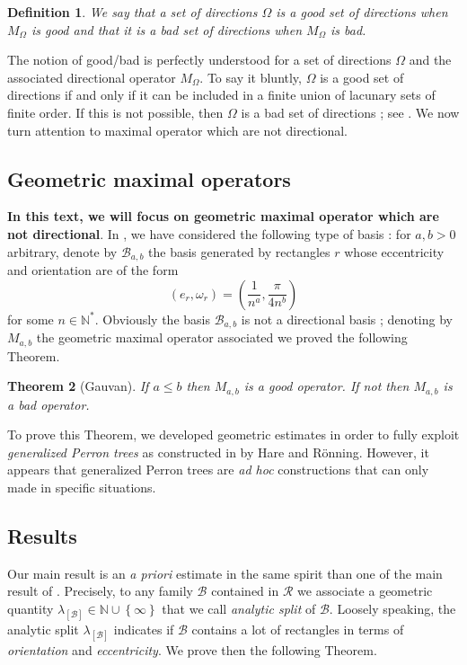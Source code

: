 \documentclass{article}
\newtheorem{thm}{Theorem}
\newtheorem{defn}[thm]{Definition}
\begin{document}
\begin{defn}
We say that a set of directions $\Omega$ is a good set of directions when $M_\Omega$ is good and that it is a  bad set of directions when $M_\Omega$ is bad.
\end{defn}

The notion of good/bad is perfectly understood for a set of directions $\Omega$ and the associated directional operator $M_\Omega$. To say it bluntly, $\Omega$ is a good set of directions if and only if it can be included in a finite union of lacunary sets of finite order. If this is not possible, then $\Omega$ is a bad set of directions ; see \cite{BATEMAN}. We now turn attention to maximal operator which are not directional.



\subsection*{Geometric maximal operators}

\textbf{In this text, we will focus on geometric maximal operator which are not directional}. In \cite{GAUVAN}, we have considered the following type of basis : for $a,b > 0$ arbitrary, denote by $\mathcal{B}_{a,b}$ the basis generated by rectangles $r$ whose eccentricity and orientation are of the form $$\left(e_r , \omega_r \right) = \left( \frac{1}{n^a}, \frac{\pi}{4n^b} \right)$$ for some $n \in \mathbb{N}^*$. Obviously the basis $\mathcal{B}_{a,b}$ is not a directional basis ; denoting by $M_{a,b}$ the geometric maximal operator associated we proved the following Theorem.

\begin{thm}[Gauvan]
If $a \leq b$ then $M_{a,b}$ is a good operator. If not then $M_{a,b}$ is a bad operator.
\end{thm}

To prove this Theorem, we developed geometric estimates in order to fully exploit \textit{generalized Perron trees} as constructed in \cite{KATHRYN JAN} by Hare and Rönning. However, it appears that generalized Perron trees are \textit{ad hoc} constructions that can only made in specific situations. 






\subsection*{Results}

Our main result is an \textit{a priori} estimate in the same spirit than one of the main result of \cite{BATEMAN}. Precisely, to any family $\mathcal{B}$ contained in $\mathcal{R}$ we associate a geometric quantity $\lambda_{[\mathcal{B}]} \in \mathbb{N} \cup \left\{\infty \right\}$ that we call \textit{analytic split} of $\mathcal{B}$. Loosely speaking, the analytic split $ \lambda_{[\mathcal{B}]}$ indicates if $\mathcal{B}$ contains a lot of rectangles in terms of \textit{orientation} and \textit{eccentricity}. We prove then the following Theorem.
\end{document}
